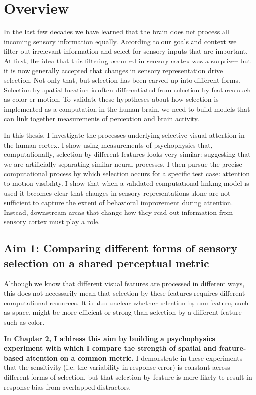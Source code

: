 \section{Overview}

In the last few decades we have learned that the brain does not process all incoming sensory information equally. According to our goals and context we filter out irrelevant information and select for sensory inputs that are important. At first, the idea that this filtering occurred in sensory cortex was a surprise-- but it is now generally accepted that changes in sensory representation drive selection. Not only that, but selection has been carved up into different forms. Selection by spatial location is often differentiated from selection by features such as color or motion. To validate these hypotheses about how selection is implemented as a computation in the human brain, we need to build models that can link together measurements of perception and brain activity.

In this thesis, I investigate the processes underlying selective visual attention in the human cortex. I show using measurements of psychophysics that, computationally, selection by different features looks very similar: suggesting that we are artificially separating similar neural processes. I then pursue the precise computational process by which selection occurs for a specific test case: attention to motion visibility. I show that when a validated computational linking model is used it becomes clear that changes in sensory representations alone are not sufficient to capture the extent of behavioral improvement during attention. Instead, downstream areas that change how they read out information from sensory cortex must play a role.

\subsection{Aim 1: Comparing different forms of sensory selection on a shared perceptual metric}

Although we know that different visual features are processed in different ways, this does not necessarily mean that selection by these features requires different computational resources. It is also unclear whether selection by one feature, such as space, might be more efficient or strong than selection by a different feature such as color.

\textbf{In Chapter 2, I address this aim by building a psychophysics experiment with which I compare the strength of spatial and feature-based attention on a common metric.} I demonstrate in these experiments that the sensitivity (i.e. the variability in response error) is constant across different forms of selection, but that selection by feature is more likely to result in response bias from overlapped distractors. 

